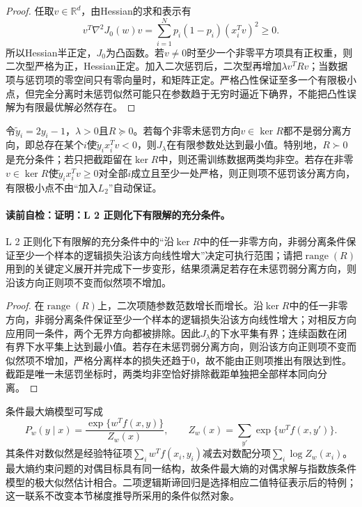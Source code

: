 \begin{proof}
任取$v\in\mathbb R^d$，由Hessian的求和表示有
\[
v^T\nabla^2J_0(w)v
=\sum_{i=1}^{N}p_i(1-p_i)(x_i^Tv)^2\geq0.
\]
所以Hessian半正定，$J_0$为凸函数。若$v\neq0$时至少一个非零平方项具有正权重，则二次型严格为正，Hessian正定。加入二次惩罚后，二次型再增加$\lambda v^TRv$；当数据项与惩罚项的零空间只有零向量时，和矩阵正定。严格凸性保证至多一个有限极小点，但完全分离时未惩罚似然可能只在参数趋于无穷时逼近下确界，不能把凸性误解为有限最优解必然存在。
\end{proof}

\begin{theorem}[$L_2$正则化下有限解的充分条件]\label{thm:V2-C05-regularized-existence}
令$\widetilde y_i=2y_i-1$，$\lambda>0$且$R\succeq0$。若每个非零未惩罚方向$v\in\ker R$都不是弱分离方向，即总存在某个$i$使$\widetilde y_i x_i^Tv<0$，则$J_\lambda$在有限参数处达到最小值。特别地，$R\succ0$是充分条件；若只把截距留在$\ker R$中，则还需训练数据两类均非空。若存在非零$v\in\ker R$使$\widetilde y_i x_i^Tv\geq0$对全部$i$成立且至少一处严格，则正则项不惩罚该分离方向，有限极小点不由“加入$L_2$”自动保证。
\end{theorem}

\paragraph{读前自检：证明：L 2 正则化下有限解的充分条件。}L 2 正则化下有限解的充分条件中的“沿$\ker R$中的任一非零方向，非弱分离条件保证至少一个样本的逻辑损失沿该方向线性增大”决定可执行范围；请把$\operatorname{range}(R)$用到的关键定义展开并完成下一步变形，结果须满足若存在未惩罚弱分离方向，则沿该方向正则项不变而似然项不增加。\par

\begin{proof}
在$\operatorname{range}(R)$上，二次项随参数范数增长而增长。沿$\ker R$中的任一非零方向，非弱分离条件保证至少一个样本的逻辑损失沿该方向线性增大；对相反方向应用同一条件，两个无界方向都被排除。因此$J_\lambda$的下水平集有界；连续函数在闭有界下水平集上达到最小值。若存在未惩罚弱分离方向，则沿该方向正则项不变而似然项不增加，严格分离样本的损失还趋于0，故不能由正则项推出有限达到性。截距是唯一未惩罚坐标时，两类均非空恰好排除截距单独把全部样本同向分离。
\end{proof}

条件最大熵模型可写成
\[
P_w(y\mid x)=\frac{\exp\{w^Tf(x,y)\}}{Z_w(x)},
\qquad Z_w(x)=\sum_{y'}\exp\{w^Tf(x,y')\}.
\]
其条件对数似然是经验特征项$\sum_iw^Tf(x_i,y_i)$减去对数配分项$\sum_i\log Z_w(x_i)$。最大熵约束问题的对偶目标具有同一结构，故条件最大熵的对偶求解与指数族条件模型的极大似然估计相合。二项逻辑斯谛回归是选择相应二值特征表示后的特例；这一联系不改变本节梯度推导所采用的条件似然对象。

